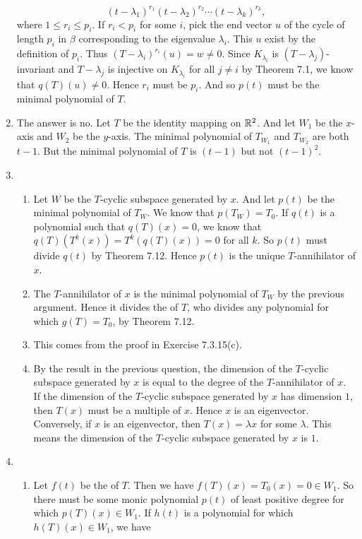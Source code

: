 \begin{enumerate}
\[(t-\lambda_1)^{r_1}(t-\lambda_2)^{r_2}\cdots (t-\lambda_k)^{r_k},\]
where $1\leq r_i\leq p_i$. If $r_i<p_i$ for some $i$, pick the end vector $u$ of the cycle of length $p_i$ in $\beta$ corresponding to the eigenvalue $\lambda_i$. This $u$ exist by the definition of $p_i$. Thus $(T-\lambda_i)^{r_i}(u)=w\neq 0$. Since $K_{\lambda_i}$ is $(T-\lambda_j)$-invariant and $T-\lambda_j$ is injective on $K_{\lambda_i}$ for all $j\neq i$ by Theorem 7.1, we know that $q(T)(u)\neq 0$. Hence $r_i$ must be $p_i$. And so $p(t)$ must be the minimal polynomial of $T$.
\item The answer is no. Let $T$ be the identity mapping on $\mathbb{R}^2$. And let $W_1$ be the $x$-axis and $W_2$ be the $y$-axis. The minimal polynomial of $T_{W_1}$ and $T_{W_2}$ are both $t-1$. But the minimal polynomial of $T$ is $(t-1)$ but not $(t-1)^2$.
\item \begin{enumerate}
\item Let $W$ be the $T$-cyclic subspace generated by $x$. And let $p(t)$ be the minimal polynomial of $T_W$. We know that $p(T_W)=T_0$. If $q(t)$ is a polynomial such that $q(T)(x)=0$, we know that $q(T)(T^k(x))=T^k(q(T)(x))=0$ for all $k$. So $p(t)$ must divide $q(t)$ by Theorem 7.12. Hence $p(t)$ is the unique $T$-annihilator of $x$.
\item The $T$-annihilator of $x$ is the minimal polynomial of $T_W$ by the previous argument. Hence it divides the \charpoly{} of $T$, who divides any polynomial for which $g(T)=T_0$, by Theorem 7.12.
\item This comes from the proof in Exercise 7.3.15(c).
\item By the result in the previous question, the dimension of the $T$-cyclic subspace generated by $x$ is equal to the degree of the $T$-annihilator of $x$. If the dimension of the $T$-cyclic subspace generated by $x$ has dimension $1$, then $T(x)$ must be a multiple of $x$. Hence $x$ is an eigenvector. Conversely, if $x$ is an eigenvector, then $T(x)=\lambda x$ for some $\lambda$. This means the dimension of the $T$-cyclic subspace generated by $x$ is $1$.
\end{enumerate}
\item \begin{enumerate}
\item Let $f(t)$ be the \charpoly{} of $T$. Then we have $f(T)(x)=T_0(x)=0\in W_1$. So there must be some monic polynomial $p(t)$ of least positive degree for which $p(T)(x)\in W_1$. If $h(t)$ is a polynomial for which $h(T)(x)\in W_1$, we have 

\end{enumerate}
\end{enumerate}
